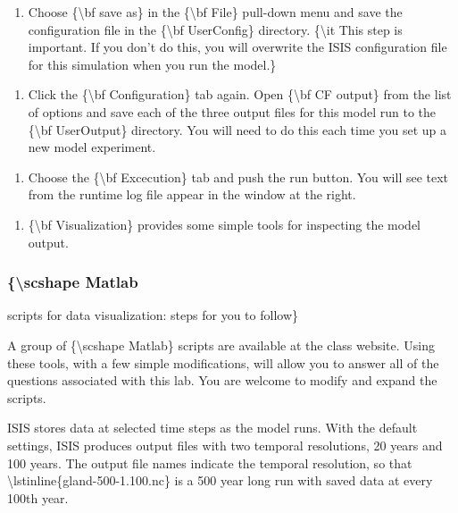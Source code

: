 \begin{enumerate}
\itemsep1pt\parskip0pt
\item
  Choose \{\textbackslash{}bf save as\} in the \{\textbackslash{}bf
  File\} pull-down menu and save the configuration file in the
  \{\textbackslash{}bf UserConfig\} directory. \{\textbackslash{}it This
  step is important. If you don't do this, you will overwrite the ISIS
  configuration file for this simulation when you run the model.\}
\end{enumerate}

\begin{enumerate}
\itemsep1pt\parskip0pt
\item
  Click the \{\textbackslash{}bf Configuration\} tab again. Open
  \{\textbackslash{}bf CF output\} from the list of options and save
  each of the three output files for this model run to the
  \{\textbackslash{}bf UserOutput\} directory. You will need to do this
  each time you set up a new model experiment.
\end{enumerate}

\begin{enumerate}
\itemsep1pt\parskip0pt
\item
  Choose the \{\textbackslash{}bf Excecution\} tab and push the run
  button. You will see text from the runtime log file appear in the
  window at the right.
\end{enumerate}

\begin{enumerate}
\itemsep1pt\parskip0pt
\item
  \{\textbackslash{}bf Visualization\} provides some simple tools for
  inspecting the model output.
\end{enumerate}

\subsubsection{\{\textbackslash{}scshape Matlab}

scripts for data visualization: steps for you to follow\}

A group of \{\textbackslash{}scshape Matlab\} scripts are available at
the class website. Using these tools, with a few simple modifications,
will allow you to answer all of the questions associated with this lab.
You are welcome to modify and expand the scripts.

ISIS stores data at selected time steps as the model runs. With the
default settings, ISIS produces output files with two temporal
resolutions, 20 years and 100 years. The output file names indicate the
temporal resolution, so that
\textbackslash{}lstinline\{gland-500-1.100.nc\} is a 500 year long run
with saved data at every 100th year.

